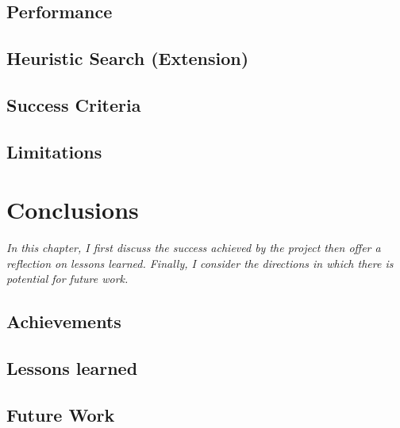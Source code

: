 \documentclass[12pt,a4paper,twoside,openright]{report}
\theoremstyle{definition}
\begin{document}
\section{Performance}

\section{Heuristic Search (Extension)}

\section{Success Criteria}

\section{Limitations}



\chapter{Conclusions}
\textit{In this chapter, I first discuss the success achieved by the project then offer a reflection on lessons learned. Finally, I consider the directions in which there is potential for future work.}
\section{Achievements}

\section{Lessons learned}

\section{Future Work}




\nocite{*}
% 



\end{document}

